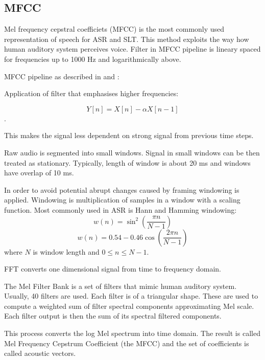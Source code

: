 \subsection{MFCC}
\label{mfcc}
Mel frequency cepstral coefficiets (MFCC) is the most commonly used representation of speech for ASR and SLT. 
This method exploits the way how human auditory system perceives voice. Filter in MFCC pipeline is lineary spaced for frequencies up to 1000 Hz and logarithmically above. 

MFCC pipeline as described in  and :

\begin{enumerate}
     Application of filter that emphasises higher frequencies:
        
        \begin{equation}
            Y[n] = X[n] - \alpha X[n-1]
        \end{equation}.
        
    This makes the signal less dependent on strong signal from previous time steps.
    
     Raw audio is segmented into small windows. Signal in small windows can be then treated as stationary. Typically, length of window is about 20 ms and windows have overlap of 10 ms.
    
     In order to avoid potential abrupt changes caused by framing windowing is applied. Windowing is multiplication of samples in a window with a scaling function. Most commonly used in ASR is Hann and Hamming windowing:
    \begin{equation}
        w(n) = \sin^2{\left( \frac{\pi n}{N - 1} \right)}
    \end{equation}
    \begin{equation}
        w(n) = 0.54 - 0.46 \cos{\left(\frac{2\pi n}{N - 1}\right)}
    \end{equation}
    where $N$ is window length and $0 \leq n \leq N - 1$.
    
     FFT converts one dimensional signal from time to frequency domain.
    
    The Mel Filter Bank is a set of filters that mimic human auditory system. Usually, 40 filters are used. Each filter is of a triangular shape. These are used to compute a weighted sum of filter spectral components approximating Mel scale.
    Each filter output is then the sum of its spectral filtered components. 
    
     This process converts the log Mel spectrum into time domain. The result is called Mel Frequency Cepstrum Coefficient (the MFCC) and the set of coefficients is called acoustic vectors.
\end{enumerate}

